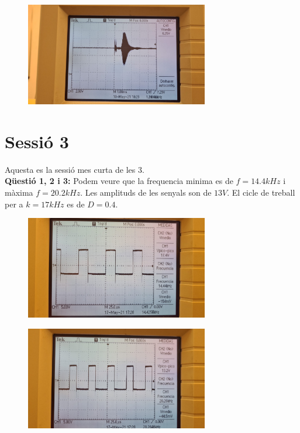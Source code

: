 \documentclass[12pt, a4papre]{article}
\begin{document}
	\begin{figure}[H]
		\begin{center}
		\includegraphics[width=80mm]{p4_10.jpeg}
		\end{center}
	\end{figure}
	
	\section{Sessió 3}
	
	Aquesta es la sessió mes curta de les 3.\\
	
	\textbf{Qüestió 1, 2 i 3:} Podem veure que la frequencia minima es de $f = 14.4kHz$ i màxima $f = 20.2kHz$. Les amplituds de les senyals son de $13V$. El cicle de treball per a $k = 17kHz$ es de $D = 0.4$.
	
	\begin{figure}[H]
		\begin{center}
		\includegraphics[width=80mm]{p4_11.jpeg}
		\end{center}
	\end{figure}
	
	\begin{figure}[H]
		\begin{center}
		\includegraphics[width=80mm]{p4_12.jpeg}
		\end{center}
	\end{figure}
	
\end{document}
